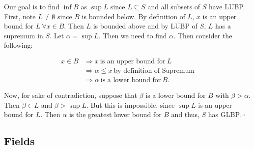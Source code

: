 \documentclass{article}
\begin{document}

Our goal is to find $\inf{B}$ as $\sup{L}$ since $L \subseteq S$ and all subsets of $S$ have LUBP.\\

First, note $L \neq \emptyset$ since $B$ is bounded below. By definition of $L$, $x$ is an upper bound for $L \ \forall x \in B$. Then $L$ is bounded above and by LUBP of $S$, $L$ has a supremum in $S$. Let $\alpha = \sup{L}$. Then we need to find $\alpha$. Then consider the following:

\begin{align*}
    x \in B &\Longrightarrow x \ \text{is an  upper bound for} \ L\\
    &\Longrightarrow \alpha \leq x \ \text{by definition of Supremum}\\
    &\Longrightarrow \alpha \ \text{is a lower bound for} \ B.
\end{align*}

Now, for sake of contradiction, suppose that $\beta$ is a lower bound for $B$ with $\beta > \alpha$. Then $\beta \in L$ and $\beta > \sup{L}$. But this is impossible, since $\sup{L}$ is an upper bound for $L$. Then $\alpha$ is the greatest lower bound for $B$ and thus, $S$ has GLBP. $\square$

\subsection{Fields}
\end{document}
